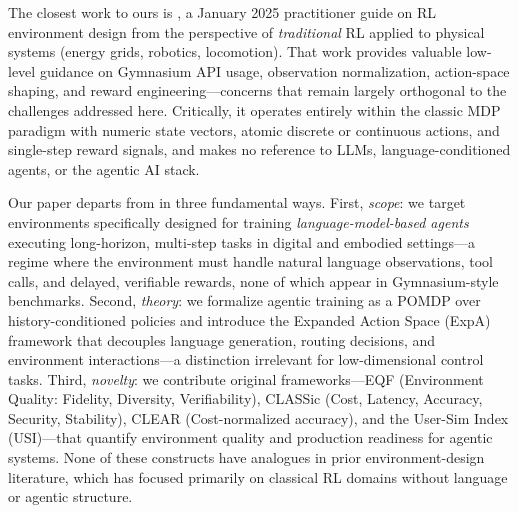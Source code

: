 The closest work to ours is \citet{wolgast2025envdesign}, a January 2025 practitioner guide on RL environment design from the perspective of \emph{traditional} RL applied to physical systems (energy grids, robotics, locomotion). That work provides valuable low-level guidance on Gymnasium API usage, observation normalization, action-space shaping, and reward engineering---concerns that remain largely orthogonal to the challenges addressed here. Critically, it operates entirely within the classic MDP paradigm with numeric state vectors, atomic discrete or continuous actions, and single-step reward signals, and makes no reference to LLMs, language-conditioned agents, or the agentic AI stack.

Our paper departs from \citeauthor{wolgast2025envdesign} in three fundamental ways. First, \emph{scope}: we target environments specifically designed for training \emph{language-model-based agents} executing long-horizon, multi-step tasks in digital and embodied settings---a regime where the environment must handle natural language observations, tool calls, and delayed, verifiable rewards, none of which appear in Gymnasium-style benchmarks. Second, \emph{theory}: we formalize agentic training as a POMDP over history-conditioned policies and introduce the Expanded Action Space (ExpA) framework that decouples language generation, routing decisions, and environment interactions---a distinction irrelevant for low-dimensional control tasks. Third, \emph{novelty}: we contribute original frameworks---EQF (Environment Quality: Fidelity, Diversity, Verifiability), CLASSic (Cost, Latency, Accuracy, Security, Stability), CLEAR (Cost-normalized accuracy), and the User-Sim Index (USI)---that quantify environment quality and production readiness for agentic systems. None of these constructs have analogues in prior environment-design literature, which has focused primarily on classical RL domains without language or agentic structure.


